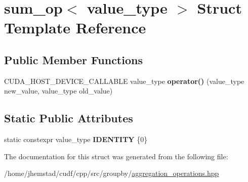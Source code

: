 \hypertarget{structsum__op}{}\section{sum\+\_\+op$<$ value\+\_\+type $>$ Struct Template Reference}
\label{structsum__op}
\subsection*{Public Member Functions}
\begin{DoxyCompactItemize}
\item 
C\+U\+D\+A\+\_\+\+H\+O\+S\+T\+\_\+\+D\+E\+V\+I\+C\+E\+\_\+\+C\+A\+L\+L\+A\+B\+LE value\+\_\+type {\bfseries operator()} (value\+\_\+type new\+\_\+value, value\+\_\+type old\+\_\+value)\hypertarget{structsum__op_a680a18f0f3acb0cbffe755360a6416cd}{}\label{structsum__op_a680a18f0f3acb0cbffe755360a6416cd}

\end{DoxyCompactItemize}
\subsection*{Static Public Attributes}
\begin{DoxyCompactItemize}
\item 
static constexpr value\+\_\+type {\bfseries I\+D\+E\+N\+T\+I\+TY} \{0\}\hypertarget{structsum__op_a325db5ec2ea4937ab852c33fe85e7762}{}\label{structsum__op_a325db5ec2ea4937ab852c33fe85e7762}

\end{DoxyCompactItemize}


The documentation for this struct was generated from the following file\+:\begin{DoxyCompactItemize}
\item 
/home/jhemstad/cudf/cpp/src/groupby/\hyperlink{aggregation__operations_8hpp}{aggregation\+\_\+operations.\+hpp}\end{DoxyCompactItemize}
